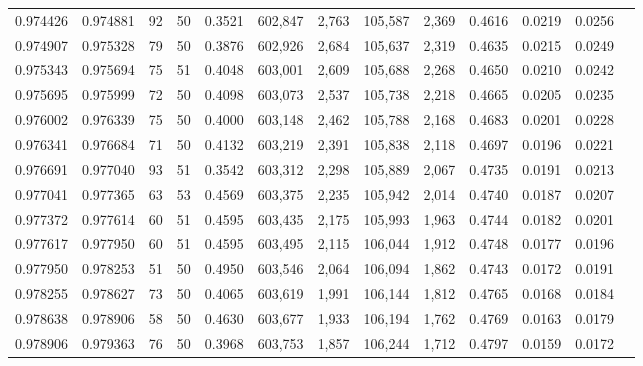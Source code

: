 \begin{tabular}{rrrrrrrrrrrrr}
0.974426 & 0.974881 &    92 &  50 &                                     0.3521 & 602,847 &   2,763 & 105,587 &   2,369 & 0.4616 & 0.0219 & 0.0256 \\
0.974907 & 0.975328 &    79 &  50 &                                     0.3876 & 602,926 &   2,684 & 105,637 &   2,319 & 0.4635 & 0.0215 & 0.0249 \\
0.975343 & 0.975694 &    75 &  51 &                                     0.4048 & 603,001 &   2,609 & 105,688 &   2,268 & 0.4650 & 0.0210 & 0.0242 \\
0.975695 & 0.975999 &    72 &  50 &                                     0.4098 & 603,073 &   2,537 & 105,738 &   2,218 & 0.4665 & 0.0205 & 0.0235 \\
0.976002 & 0.976339 &    75 &  50 &                                     0.4000 & 603,148 &   2,462 & 105,788 &   2,168 & 0.4683 & 0.0201 & 0.0228 \\
0.976341 & 0.976684 &    71 &  50 &                                     0.4132 & 603,219 &   2,391 & 105,838 &   2,118 & 0.4697 & 0.0196 & 0.0221 \\
0.976691 & 0.977040 &    93 &  51 &                                     0.3542 & 603,312 &   2,298 & 105,889 &   2,067 & 0.4735 & 0.0191 & 0.0213 \\
0.977041 & 0.977365 &    63 &  53 &                                     0.4569 & 603,375 &   2,235 & 105,942 &   2,014 & 0.4740 & 0.0187 & 0.0207 \\
0.977372 & 0.977614 &    60 &  51 &                                     0.4595 & 603,435 &   2,175 & 105,993 &   1,963 & 0.4744 & 0.0182 & 0.0201 \\
0.977617 & 0.977950 &    60 &  51 &                                     0.4595 & 603,495 &   2,115 & 106,044 &   1,912 & 0.4748 & 0.0177 & 0.0196 \\
0.977950 & 0.978253 &    51 &  50 &                                     0.4950 & 603,546 &   2,064 & 106,094 &   1,862 & 0.4743 & 0.0172 & 0.0191 \\
0.978255 & 0.978627 &    73 &  50 &                                     0.4065 & 603,619 &   1,991 & 106,144 &   1,812 & 0.4765 & 0.0168 & 0.0184 \\
0.978638 & 0.978906 &    58 &  50 &                                     0.4630 & 603,677 &   1,933 & 106,194 &   1,762 & 0.4769 & 0.0163 & 0.0179 \\
0.978906 & 0.979363 &    76 &  50 &                                     0.3968 & 603,753 &   1,857 & 106,244 &   1,712 & 0.4797 & 0.0159 & 0.0172 \\

\end{tabular}
